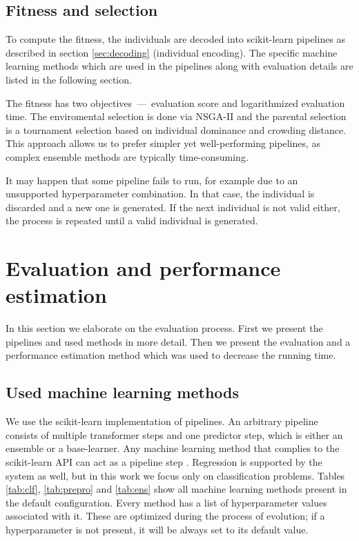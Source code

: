 \subsection{Fitness and selection} \label{sec:fitsel}
To compute the fitness, the individuals are decoded into scikit-learn 
pipelines as described in section \ref{sec:decoding} (individual encoding).
The specific machine learning methods which are used in the pipelines along
with evaluation details are listed in the following section.

The fitness has two objectives~---~evaluation score and logarithmized
evaluation time. The enviromental selection is done via NSGA-II and the 
parental selection is a tournament selection based on individual dominance and 
crowding distance. This approach allows us to prefer simpler yet
well-performing pipelines, as complex ensemble methods are typically
time-consuming. 

It may happen that some pipeline fails to run, for example due to an
unsupported hyperparameter combination. In that case, the individual is
discarded and a new one is generated. If the next individual is not valid
either, the process is repeated until a valid individual is generated.

\section{Evaluation and performance estimation} \label{genens:eval}
In this section we elaborate on the evaluation process. First we present the
pipelines and used methods in more detail. Then we present the evaluation and
a performance estimation method which was used to decrease the running time.

\subsection{Used machine learning methods} \label{tab03:methods}
We use the scikit-learn implementation of pipelines. An arbitrary pipeline
consists of multiple transformer steps and one predictor step, which is either
an ensemble or a base-learner. Any machine learning method that complies to the
scikit-learn API can act as a pipeline step \citep{sklearn_api}. Regression is
supported by the system as well, but in this work we focus only on
classification problems. Tables \ref{tab:clf}, \ref{tab:prepro} and
\ref{tab:ens} show all machine learning methods present in the default
configuration. Every method has a list of hyperparameter values associated
with it. These are optimized during the process of evolution;
if a hyperparameter is not present, it will be always set to its default value.

